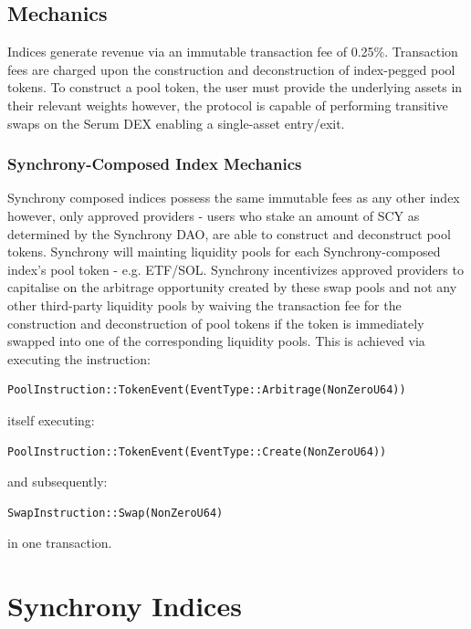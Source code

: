 \documentclass[10pt]{article}
\begin{document}
					\subsection{Mechanics}
					Indices generate revenue via an immutable transaction fee of 0.25\%. Transaction
					fees are charged upon the construction and deconstruction of index-pegged pool
					tokens.
					To construct a pool token, the user must provide the underlying assets in their
					relevant weights however, the protocol is capable of performing transitive swaps
					on the Serum DEX enabling a single-asset entry/exit.

					\subsubsection{Synchrony-Composed Index Mechanics}
					Synchrony composed indices possess the same immutable fees as any other index
					however, only approved providers - users who stake an amount of SCY as
					determined by the Synchrony DAO, are able to construct and deconstruct pool
					tokens.
					Synchrony will mainting liquidity pools for each Synchrony-composed index's
					pool token - e.g. ETF/SOL. Synchrony incentivizes approved providers to
					capitalise on the arbitrage opportunity created by these swap pools and not any
					other third-party liquidity pools by waiving the transaction fee for the construction and deconstruction of pool tokens
					if the token is immediately swapped into one of the corresponding liquidity
					pools. This is achieved via executing the instruction:
					\begin{verbatim}PoolInstruction::TokenEvent(EventType::Arbitrage(NonZeroU64))\end{verbatim} 
					itself executing:
					\begin{verbatim}PoolInstruction::TokenEvent(EventType::Create(NonZeroU64))\end{verbatim} and
					subsequently: \begin{verbatim}SwapInstruction::Swap(NonZeroU64)\end{verbatim} in one transaction.

					\section{Synchrony Indices}
\end{document}
